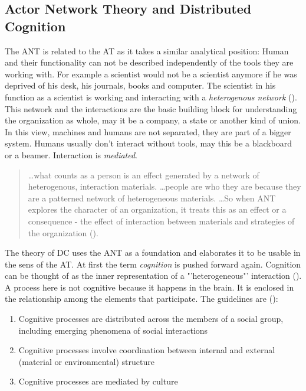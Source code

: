 \subsection{Actor Network Theory and Distributed Cognition}
The \ac{ANT} is related to the \acs{AT} as it takes a similar analytical position: Human and their functionality can not be described independently of the tools they are working with. For example a scientist would not be a scientist anymore if he was deprived of his desk, his journals, books and computer. The scientist in his function as a scientist is working and interacting with a \textit{heterogenous network} (\cite{law1992notes}). This network and the interactions are the basic building block for understanding the organization as whole, may it be a company, a state or another kind of union. In this view, machines and humans are not separated, they are part of a bigger system. Humans usually don't interact without tools, may this be a blackboard or a beamer. Interaction is  \textit{mediated}.
\begin{quotation}
  \dots what counts as a person is an effect generated by a network of heterogenous, interaction materials. \dots people are who they are because they are a patterned network of heterogeneous materials. \dots So when \acs{ANT} explores the character of an organization, it treats this as an effect or a consequence - the effect of interaction between materials and strategies of the organization (\cite{law1992notes}).
\end{quotation}

The theory of \ac{DC} uses the \acs{ANT} as a foundation and elaborates it to be usable in the sens of the \acs{AT}. At first the term \textit{cognition} is pushed forward again. Cognition can be thought of as the inner representation of a "'heterogeneous"' interaction (\cite{hutchins2000distributed}). A process here is not cognitive because it happens in the brain. It is enclosed in the relationship among the elements that participate. The guidelines are (\cite{hollan2000distributed}):
\begin{enumerate}
  \item Cognitive processes are distributed across the members of a social group, including emerging phenomena of social interactions
  \item Cognitive processes involve coordination between internal and external (material or environmental) structure
  \item Cognitive processes are mediated by culture
\end{enumerate}

